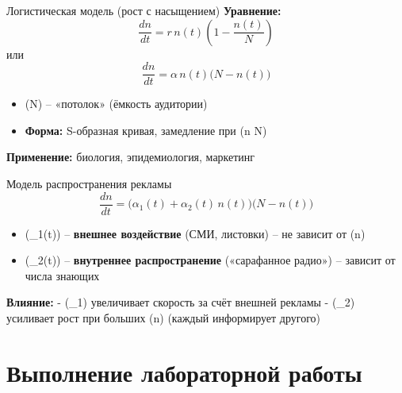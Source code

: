 \documentclass[
  ignorenonframetext,
  aspectratio=169,
  russian,
]{beamer}
\providecommand{\tightlist}{%
  \setlength{\itemsep}{0pt}\setlength{\parskip}{0pt}}
\begin{document}
\begin{frame}{Логистическая модель (рост с насыщением)}
\protect{}\label{ux43bux43eux433ux438ux441ux442ux438ux447ux435ux441ux43aux430ux44f-ux43cux43eux434ux435ux43bux44c-ux440ux43eux441ux442-ux441-ux43dux430ux441ux44bux449ux435ux43dux438ux435ux43c}
\textbf{Уравнение:}
\[\frac{dn}{dt} = r\, n(t)\left(1 - \frac{n(t)}{N}\right)\] или
\[\frac{dn}{dt} = \alpha\, n(t)\bigl(N - n(t)\bigr)\]

\begin{itemize}[<+->]
\tightlist
\item
  (N) -- «потолок» (ёмкость аудитории)
\item
  \textbf{Форма:} S-образная кривая, замедление при (n \to N)
\end{itemize}

\textbf{Применение:} биология, эпидемиология, маркетинг
\end{frame}

\begin{frame}{Модель распространения рекламы}
\protect{}\label{ux43cux43eux434ux435ux43bux44c-ux440ux430ux441ux43fux440ux43eux441ux442ux440ux430ux43dux435ux43dux438ux44f-ux440ux435ux43aux43bux430ux43cux44b}
\[\frac{dn}{dt} = \bigl(\alpha_1(t) + \alpha_2(t)\, n(t)\bigr)\bigl(N - n(t)\bigr)\]

\begin{itemize}[<+->]
\tightlist
\item
  (\alpha\_1(t)) -- \textbf{внешнее воздействие} (СМИ, листовки) -- не
  зависит от (n)
\item
  (\alpha\_2(t)) -- \textbf{внутреннее распространение} («сарафанное
  радио») -- зависит от числа знающих
\end{itemize}

\textbf{Влияние:} - (\alpha\_1) увеличивает скорость за счёт внешней
рекламы - (\alpha\_2) усиливает рост при больших (n) (каждый информирует
другого)
\end{frame}

\section{Выполнение лабораторной
работы}\label{ux432ux44bux43fux43eux43bux43dux435ux43dux438ux435-ux43bux430ux431ux43eux440ux430ux442ux43eux440ux43dux43eux439-ux440ux430ux431ux43eux442ux44b}
\end{document}
